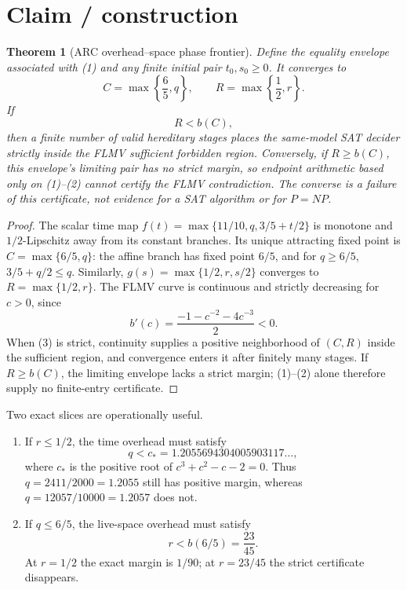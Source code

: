 \documentclass[11pt]{article}
\newtheorem{theorem}{Theorem}
\begin{document}
\section*{Claim / construction}
\begin{theorem}[ARC overhead--space phase frontier]
Define the equality envelope associated with (1) and any finite initial pair
$t_0,s_0\ge0$.  It converges to
\[
 C=\max\left\{\frac65,q\right\},
 \qquad
 R=\max\left\{\frac12,r\right\}.
\]
If
\begin{equation}
 \boxed{R<b(C),}
 \tag{3}
\end{equation}
then a finite number of valid hereditary stages places the same-model SAT
decider strictly inside the FLMV sufficient forbidden region.  Conversely, if
$R\ge b(C)$, this envelope's limiting pair has no strict margin, so endpoint
arithmetic based only on (1)--(2) cannot certify the FLMV contradiction.
The converse is a failure of this certificate, not evidence for a SAT
algorithm or for $P=NP$.
\end{theorem}

\begin{proof}
The scalar time map
$f(t)=\max\{11/10,q,3/5+t/2\}$ is monotone and $1/2$-Lipschitz away from its
constant branches.  Its unique attracting fixed point is
$C=\max\{6/5,q\}$: the affine branch has fixed point $6/5$, and for
$q\ge6/5$, $3/5+q/2\le q$.  Similarly,
$g(s)=\max\{1/2,r,s/2\}$ converges to $R=\max\{1/2,r\}$.
The FLMV curve is continuous and strictly decreasing for $c>0$, since
\[
 b'(c)=\frac{-1-c^{-2}-4c^{-3}}{2}<0.
\]
When (3) is strict, continuity supplies a positive neighborhood of $(C,R)$
inside the sufficient region, and convergence enters it after finitely many
stages.  If $R\ge b(C)$, the limiting envelope lacks a strict margin; (1)--(2)
alone therefore supply no finite-entry certificate.
\end{proof}

Two exact slices are operationally useful.
\begin{enumerate}[leftmargin=*]
  \item If $r\le1/2$, the time overhead must satisfy
  \[
  q<c_*=1.2055694304005903117\ldots,
  \]
  where $c_*$ is the positive root of
  $c^3+c^2-c-2=0$.  Thus $q=2411/2000=1.2055$ still has positive margin,
  whereas $q=12057/10000=1.2057$ does not.
  \item If $q\le6/5$, the live-space overhead must satisfy
  \[
  r< b(6/5)=\frac{23}{45}.
  \]
  At $r=1/2$ the exact margin is $1/90$; at $r=23/45$ the strict certificate
  disappears.
\end{enumerate}
\end{document}
